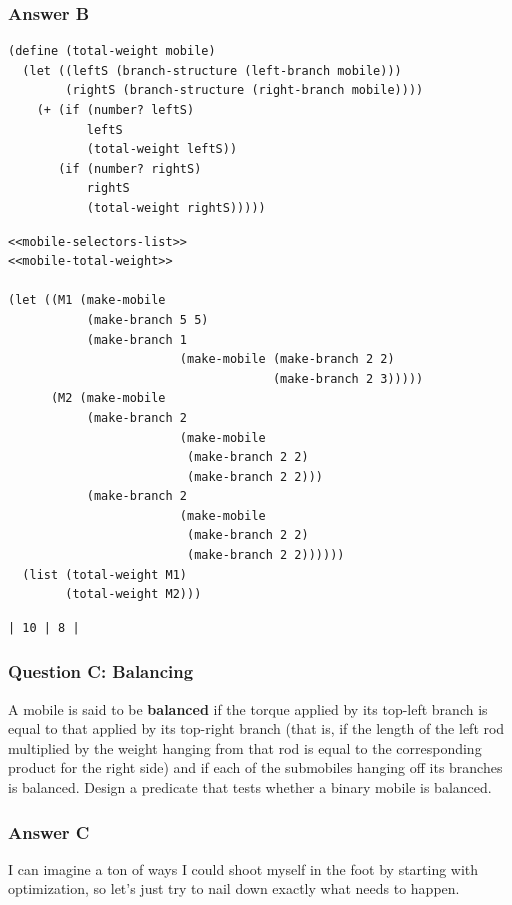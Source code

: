 \documentclass[final,fleqn,titlepage,twoside]{article}
\begin{document}
\subsubsection{Answer B}
\label{sec:org9b74eea}
\begin{verbatim}
(define (total-weight mobile)
  (let ((leftS (branch-structure (left-branch mobile)))
        (rightS (branch-structure (right-branch mobile))))
    (+ (if (number? leftS)
           leftS
           (total-weight leftS))
       (if (number? rightS)
           rightS
           (total-weight rightS)))))
\end{verbatim}


\begin{verbatim}
<<mobile-selectors-list>>
<<mobile-total-weight>>

(let ((M1 (make-mobile
           (make-branch 5 5)
           (make-branch 1
                        (make-mobile (make-branch 2 2)
                                     (make-branch 2 3)))))
      (M2 (make-mobile
           (make-branch 2
                        (make-mobile
                         (make-branch 2 2)
                         (make-branch 2 2)))
           (make-branch 2
                        (make-mobile
                         (make-branch 2 2)
                         (make-branch 2 2))))))
  (list (total-weight M1)
        (total-weight M2)))
\end{verbatim}

\begin{verbatim}
| 10 | 8 |
\end{verbatim}

\subsubsection{Question C: Balancing}
\label{sec:org55ddb35}
A mobile is said to be \textbf{balanced} if the torque applied by its top-left branch is
equal to that applied by its top-right branch (that is, if the length of the
left rod multiplied by the weight hanging from that rod is equal to the
corresponding product for the right side) and if each of the submobiles hanging
off its branches is balanced. Design a predicate that tests whether a binary
mobile is balanced.

\subsubsection{Answer C}
\label{sec:org28bf786}
I can imagine a ton of ways I could shoot myself in the foot by starting with
optimization, so let's just try to nail down exactly what needs to happen.
\end{document}
